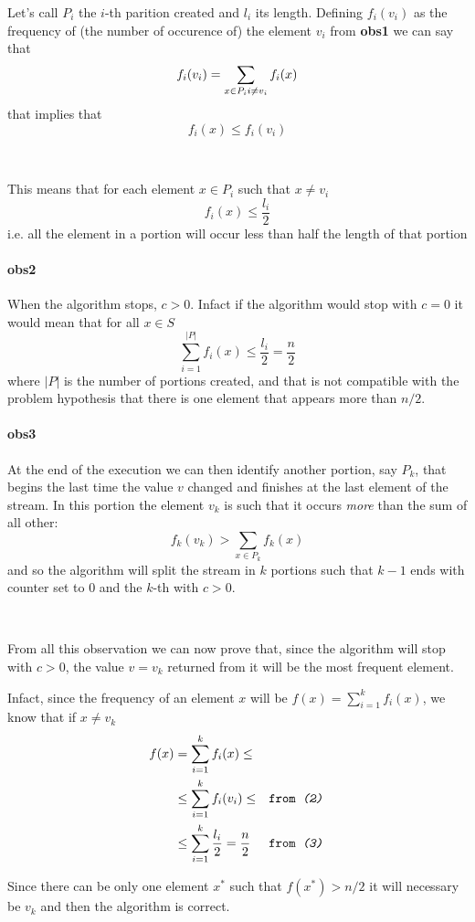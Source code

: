 \documentclass[a4paper]{article}
\begin{document}
\noindent 
Let's call $P_i$ the $i$-th parition created and $l_i$ its length. Defining $f_i(v_i)$ as the frequency of (the number of occurence of) the element $v_i$ from \textbf{obs1} we can say that 
\begin{equation}
f_i(v_i) = \sum_{x \in P_i \\ i \neq v_i} f_i(x)
\end{equation}
that implies that
\begin{equation}
f_i(x) \leq f_i(v_i)
\end{equation}

\

\noindent
This means that for each element $x \in P_i$ such that $x \neq v_i$
\begin{equation}
f_i(x) \leq  \frac{l_i}{2}%
\end{equation}
i.e. all the element in a portion will occur less than half the length of that portion

\paragraph{obs2} When the algorithm stops, $c>0$. Infact if the algorithm would stop with $c=0$ it would mean that for all $x \in S$
\begin{displaymath}
\sum_{i=1}^{|P|} f_i(x) \leq \frac{l_i}{2} = \frac{n}{2} 
\end{displaymath}
where $|P|$ is the number of portions created, and that is not compatible with the problem hypothesis that there is one element that appears more than $n/2$.


\paragraph{obs3} 
At the end of the execution we can then identify another portion, say $P_k$, that begins the last time the value $v$ changed and finishes at the last element of the stream.
In this portion the element $v_k$ is such that it occurs \emph{more} than the sum of all other:
\begin{equation}
f_k(v_k) > \sum_{x \in P_k} f_k(x)
\end{equation}
and so the algorithm will split the stream in $k$ portions such that $k-1$ ends with counter set to $0$ and the $k$-th with $c > 0$.

\

\noindent
From all this observation we can now prove that, since the algorithm will stop with $c>0$, the value $v = v_k$ returned from it will be the most frequent element.

\noindent
Infact, since the frequency of an element $x$ will be $f(x) = \sum_{i=1}^k f_i(x)$, we know that if $x \neq v_k$
\begin{align*}
f(x) &= \sum_{i=1}^k f_i(x) \leq \\
&\leq \sum_{i=1}^{k} f_i(v_i) \leq &\texttt{from \textit{(2)}}\\
&\leq \sum_{i=1}^{k} \frac{l_i}{2} = \frac{n}{2}  &\texttt{from \textit{(3)}}
\end{align*}

Since there can be only one element $x^*$ such that $f(x^*) > n/2$ it will necessary be $v_k$ and then the algorithm is correct.
\end{document}
